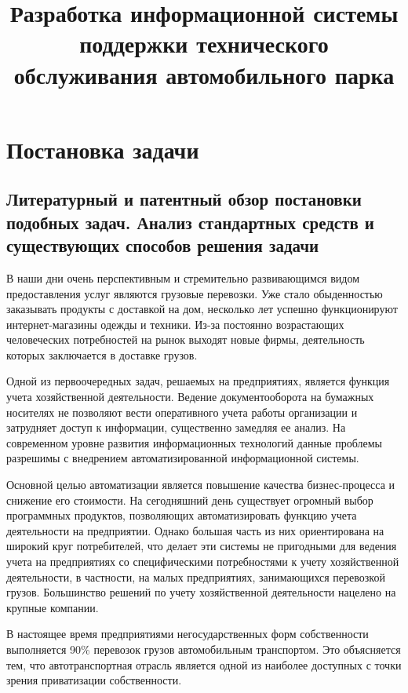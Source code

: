\documentclass{lstu-diploma}
\title{Разработка информационной системы поддержки технического обслуживания автомобильного парка}
\begin{document}
\maketitle

\tableofcontents

\chapter{Постановка задачи}

\section{Литературный и патентный обзор постановки подобных задач.
Анализ стандартных средств и существующих способов решения задачи}

В наши дни очень перспективным и стремительно развивающимся видом предоставления
услуг являются грузовые перевозки.
Уже стало обыденностью заказывать продукты с доставкой на дом, несколько лет
успешно функционируют интернет-магазины одежды и техники.
Из-за постоянно возрастающих человеческих потребностей на рынок выходят новые
фирмы, деятельность которых заключается в доставке грузов.

Одной из первоочередных задач, решаемых на предприятиях, является функция
учета хозяйственной деятельности.
Ведение документооборота на бумажных носителях не позволяют вести оперативного
учета работы организации и затрудняет доступ к информации, существенно замедляя
ее анализ.
На современном уровне развития информационных технологий данные проблемы
разрешимы с внедрением автоматизированной информационной системы.

Основной целью автоматизации является повышение качества бизнес-процесса и
снижение его стоимости.
На сегодняшний день существует огромный выбор программных продуктов, позволяющих
автоматизировать функцию учета деятельности на предприятии.
Однако большая часть из них ориентирована на широкий круг потребителей, что
делает эти системы не пригодными для ведения учета на предприятиях со
специфическими потребностями к учету хозяйственной деятельности,
в частности, на малых предприятиях, занимающихся перевозкой грузов.
Большинство решений по учету хозяйственной деятельности нацелено на крупные
компании.

В настоящее время предприятиями негосударственных форм собственности выполняется
90\% перевозок грузов автомобильным транспортом. Это объясняется тем, что
автотранспортная отрасль является одной из наиболее доступных с точки зрения
приватизации собственности.
\end{document}
